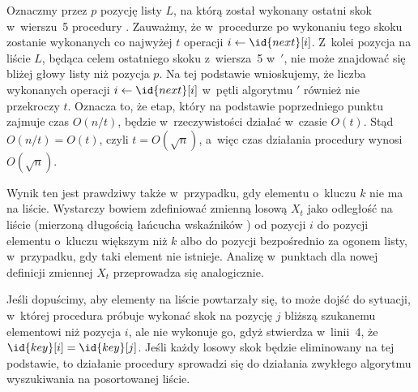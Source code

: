 \subproblem %
Oznaczmy przez $p$ pozycję listy $L$, na którą został wykonany ostatni skok w~wierszu~5 procedury . Zauważmy, że w~procedurze  po wykonaniu tego skoku zostanie wykonanych co najwyżej $t$ operacji $i\gets\id{next}[i]$. Z~kolei pozycja na liście $L$, będąca celem ostatniego skoku z~wiersza~5 w~$'$, nie może znajdować się bliżej głowy listy niż pozycja $p$. Na tej podstawie wnioskujemy, że liczba wykonanych operacji $i\gets\id{next}[i]$ w~pętli  algorytmu $'$ również nie przekroczy $t$. Oznacza to, że etap, który na podstawie poprzedniego punktu zajmuje czas $O(n/t)$, będzie w~rzeczywistości działać w~czasie $O(t)$. Stąd $O(n/t)=O(t)$, czyli $t=O(\!\sqrt{n})$, a~więc czas działania procedury  wynosi $O(\!\sqrt{n})$.

Wynik ten jest prawdziwy także w~przypadku, gdy elementu o~kluczu $k$ nie ma na liście. Wystarczy bowiem zdefiniować zmienną losową $X_t$ jako odległość na liście (mierzoną długością łańcucha wskaźników ) od pozycji $i$ do pozycji elementu o~kluczu większym niż $k$ albo do pozycji bezpośrednio za ogonem listy, w~przypadku, gdy taki element nie istnieje. Analizę w~punktach  dla nowej definicji zmiennej $X_t$ przeprowadza się analogicznie.

\subproblem %
Jeśli dopuścimy, aby elementy na liście powtarzały się, to może dojść do sytuacji, w~której procedura próbuje wykonać skok na pozycję $j$ bliższą szukanemu elementowi niż pozycja $i$, ale nie wykonuje go, gdyż stwierdza w~linii~4, że $\id{key}[i]=\id{key}[j]$. Jeśli każdy losowy skok będzie eliminowany na tej podstawie, to działanie procedury sprowadzi się do działania zwykłego algorytmu wyszukiwania na posortowanej liście.

\endinput